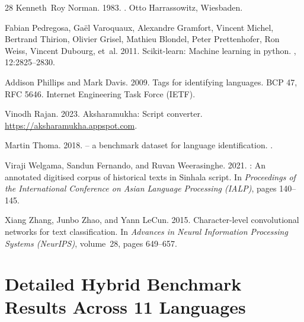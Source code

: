 \documentclass[11pt]{article}
\begin{document}
\begin{thebibliography}{28}
Kenneth~Roy Norman. 1983.
.
\newblock Otto Harrassowitz, Wiesbaden.

Fabian Pedregosa, Ga{\"e}l Varoquaux, Alexandre Gramfort, Vincent Michel, Bertrand Thirion, Olivier Grisel, Mathieu Blondel, Peter Prettenhofer, Ron Weiss, Vincent Dubourg, et~al. 2011.
\newblock Scikit-learn: Machine learning in python.
, 12:2825--2830.

Addison Phillips and Mark Davis. 2009.
\newblock Tags for identifying languages. {BCP 47}, {RFC 5646}.
\newblock Internet Engineering Task Force (IETF).

Vinodh Rajan. 2023.
\newblock Aksharamukha: Script converter.
\newblock \url{https://aksharamukha.appspot.com}.

Martin Thoma. 2018.
 -- a benchmark dataset for language identification.
.

Viraji Welgama, Sandun Fernando, and Ruvan Weerasinghe. 2021.
: An annotated digitised corpus of historical texts in {Sinhala} script.
\newblock In {\em Proceedings of the International Conference on Asian Language Processing (IALP)}, pages 140--145.

Xiang Zhang, Junbo Zhao, and Yann LeCun. 2015.
\newblock Character-level convolutional networks for text classification.
\newblock In {\em Advances in Neural Information Processing Systems (NeurIPS)}, volume~28, pages 649--657.

\end{thebibliography}

\appendix
\section{Detailed Hybrid Benchmark Results Across 11 Languages}
\label{sec:appendix_tables}
\end{document}
